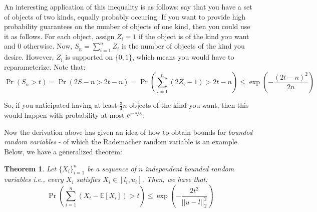 \documentclass{article}
\newtheorem{theorem}{Theorem}[subsection]
\theoremstyle{remark}
\newcommand{\Exp}{\mathbb{E}}
\begin{document}
An interesting application of this inequality is as follows: say that you have a set of objects of two kinds, equally probably occuring. If you want to provide high probability guarantees on the number of objects of one kind, then you could use it as follows. For each object, assign \(Z_{i} = 1\) if the object is of the kind you want and \(0\) otherwise. Now, \(S_{n} = \sum\limits_{i=1}^{n} Z_{i}\) is the number of objects of the kind you desire. However, \(Z_{i}\) is supported on \(\{0, 1\}\), which means you would have to reparameterize. Note that:
\begin{equation*}
\Pr(S_{n} > t) = \Pr(2S - n > 2t - n) = \Pr\left(\sum_{i=1}^{n}(2Z_{i} - 1) > 2t - n\right) \leq \exp\left(-\frac{(2t - n)^{2}}{2n}\right)
\end{equation*}

So, if you anticipated having at least \(\frac{3}{4}n\) objects of the kind you want, then this would happen with probability at most \(e^{-\nicefrac{n}{8}}\).

Now the derivation above has given an idea of how to obtain bounds for \emph{bounded random variables} - of which the Rademacher random variable is an example. Below, we have a generalized theorem:
\begin{theorem}
\label{thm:bounded-hoeffding}
Let \(\{X_{i}\}_{i=1}^{n}\) be a sequence of \(n\) independent bounded random variables i.e., every \(X_{i}\) satisfies \(X_{i} \in [l_{i}, u_{i}]\). Then, we have that:
\begin{equation*}
\Pr\left(\sum_{i=1}^{n}(X_{i} - \Exp[X_{i}]) > t\right) \leq \exp\left(-\frac{2t^{2}}{||u - l||_{2}^{2}}\right)
\end{equation*}
\end{theorem}
\end{document}
